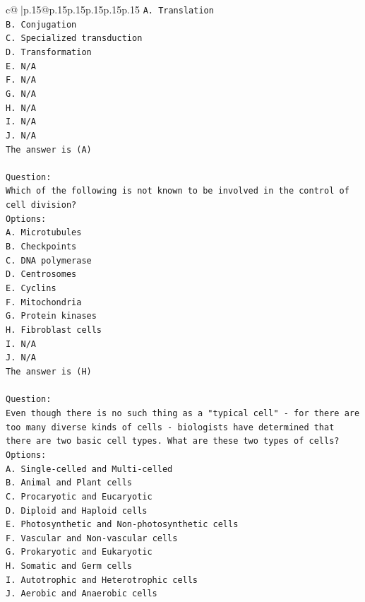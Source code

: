 \documentclass{article}
\begin{document}
{\begin{supertabular}{c@{$\;$}|p{.15\linewidth}@{}p{.15\linewidth}p{.15\linewidth}p{.15\linewidth}p{.15\linewidth}p{.15\linewidth}}
{{{\texttt{A. Translation} \\
\texttt{B. Conjugation} \\
\texttt{C. Specialized transduction} \\
\texttt{D. Transformation} \\
\texttt{E. N/A} \\
\texttt{F. N/A} \\
\texttt{G. N/A} \\
\texttt{H. N/A} \\
\texttt{I. N/A} \\
\texttt{J. N/A} \\
\texttt{The answer is (A)} \\
\\ 
\texttt{Question:} \\
\texttt{Which of the following is not known to be involved in the control of cell division?} \\
\texttt{Options:} \\
\texttt{A. Microtubules} \\
\texttt{B. Checkpoints} \\
\texttt{C. DNA polymerase} \\
\texttt{D. Centrosomes} \\
\texttt{E. Cyclins} \\
\texttt{F. Mitochondria} \\
\texttt{G. Protein kinases} \\
\texttt{H. Fibroblast cells} \\
\texttt{I. N/A} \\
\texttt{J. N/A} \\
\texttt{The answer is (H)} \\
\\ 
\texttt{Question:} \\
\texttt{Even though there is no such thing as a "typical cell" {-} for there are too many diverse kinds of cells {-} biologists have determined that there are two basic cell types. What are these two types of cells?} \\
\texttt{Options:} \\
\texttt{A. Single{-}celled and Multi{-}celled} \\
\texttt{B. Animal and Plant cells} \\
\texttt{C. Procaryotic and Eucaryotic} \\
\texttt{D. Diploid and Haploid cells} \\
\texttt{E. Photosynthetic and Non{-}photosynthetic cells} \\
\texttt{F. Vascular and Non{-}vascular cells} \\
\texttt{G. Prokaryotic and Eukaryotic} \\
\texttt{H. Somatic and Germ cells} \\
\texttt{I. Autotrophic and Heterotrophic cells} \\
\texttt{J. Aerobic and Anaerobic cells} \\
            }
        }
    }
     \\ \\


\end{supertabular}}
\end{document}
